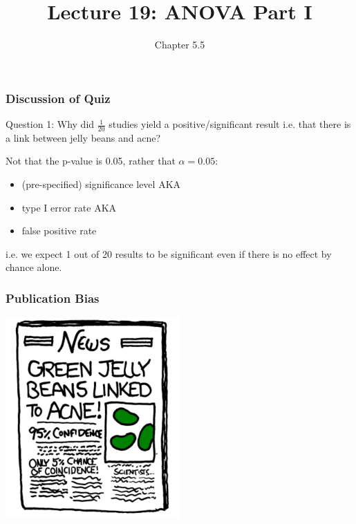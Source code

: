\documentclass[handout]{beamer}
\title{Lecture 19: ANOVA Part I}
\author{Chapter 5.5}
\date{}
\newcommand{\blue}[1]{\textcolor{blue2}{#1}}
\begin{document}
\begin{frame}
\titlepage
\end{frame}


\begin{frame}[fragile]
\frametitle{Discussion of Quiz}
\blue{Question 1}:  Why did $\frac{1}{20}$ studies yield a positive/significant result i.e. that there is a link between jelly beans and acne?

\vspace{0.5cm}


\pause Not that the p-value is 0.05, rather that \blue{$\alpha=0.05$}:
\pause\begin{itemize}
\item (pre-specified) significance level AKA
\item type I error rate AKA
\item false positive rate
\end{itemize}
\pause i.e. we expect 1 out of 20 results to be significant even if there is no effect by chance alone.


\end{frame}


\begin{frame}[fragile]
\frametitle{Publication Bias}

\begin{center}
\includegraphics[width=0.5\textwidth]{figure/jelly.png}
\end{center}

\end{frame}
\end{document}
